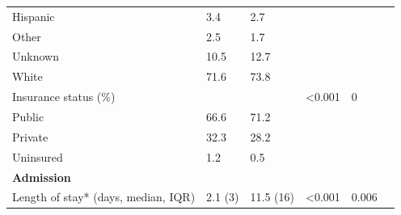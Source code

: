 \documentclass{ws-procs11x85}
\begin{document}
\begin{table}[H]
\begin{adjustbox}{width=1\textwidth}
\begin{tabular}{llllll}
\hspace{2cm} Hispanic                                     & 3.4                                     & 2.7                                 &                  &                         &  \\
\hspace{2cm} Other                                        & 2.5                                     & 1.7                                 &                  &                         &  \\
\hspace{2cm} Unknown                                      & 10.5                                    & 12.7                                &                  &                         &  \\
\hspace{2cm} White                                        & 71.6                                    & 73.8                                &                  &                         &  \\
\hspace{1cm} Insurance status (\%)                               &                                         &                                     & \textless 0.001  & 0                       &  \\
\hspace{2cm} Public                                        & 66.6                                    & 71.2                                &                  &                         &  \\
\hspace{2cm} Private                                        & 32.3                                      & 28.2                                 &                  &                         &  \\
\hspace{2cm} Uninsured                                     & 1.2                                     & 0.5                                 &                  &                         &  \\
\textbf{Admission}                        &                                         &                                     &                  &                         &  \\
\hspace{1cm} Length of stay* (days, median, IQR)              & 2.1 (3)        & 11.5 (16)                         & \textless 0.001  & 0.006                   &  \\

\end{tabular}
\end{adjustbox}
\end{table}
\end{document}
